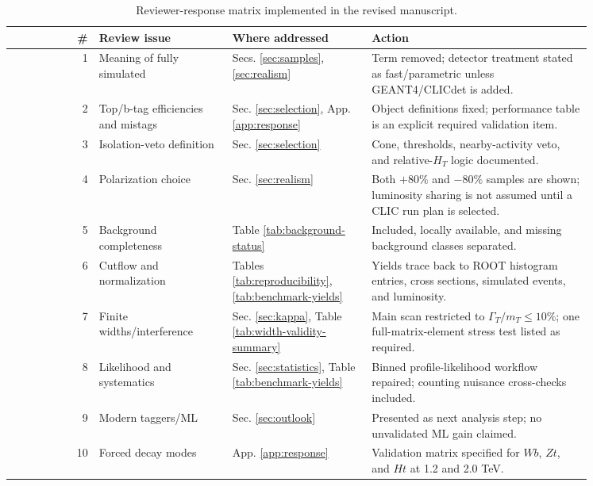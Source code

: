 \begin{table}[p]
\centering
\caption{Reviewer-response matrix implemented in the revised manuscript.}
\label{tab:response-matrix}
\small
\begin{tabular}{r p{0.23\linewidth} p{0.24\linewidth} p{0.38\linewidth}}
\toprule
\# & Review issue & Where addressed & Action \\
\midrule
    1 & Meaning of fully simulated & Secs. \ref{sec:samples}, \ref{sec:realism} & Term removed; detector treatment stated as fast/parametric unless GEANT4/CLICdet is added. \\
    2 & Top/b-tag efficiencies and mistags & Sec. \ref{sec:selection}, App. \ref{app:response} & Object definitions fixed; performance table is an explicit required validation item. \\
    3 & Isolation-veto definition & Sec. \ref{sec:selection} & Cone, thresholds, nearby-activity veto, and relative-$H_T$ logic documented. \\
    4 & Polarization choice & Sec. \ref{sec:realism} & Both $+80\%$ and $-80\%$ samples are shown; luminosity sharing is not assumed until a CLIC run plan is selected. \\
    5 & Background completeness & Table \ref{tab:background-status} & Included, locally available, and missing background classes separated. \\
    6 & Cutflow and normalization & Tables \ref{tab:reproducibility}, \ref{tab:benchmark-yields} & Yields trace back to ROOT histogram entries, cross sections, simulated events, and luminosity. \\
    7 & Finite widths/interference & Sec. \ref{sec:kappa}, Table \ref{tab:width-validity-summary} & Main scan restricted to $\Gamma_T/m_T\le10\%$; one full-matrix-element stress test listed as required. \\
    8 & Likelihood and systematics & Sec. \ref{sec:statistics}, Table \ref{tab:benchmark-yields} & Binned profile-likelihood workflow repaired; counting nuisance cross-checks included. \\
    9 & Modern taggers/ML & Sec. \ref{sec:outlook} & Presented as next analysis step; no unvalidated ML gain claimed. \\
    10 & Forced decay modes & App. \ref{app:response} & Validation matrix specified for $Wb$, $Zt$, and $Ht$ at 1.2 and 2.0 TeV. \\
\bottomrule
\end{tabular}
\end{table}
